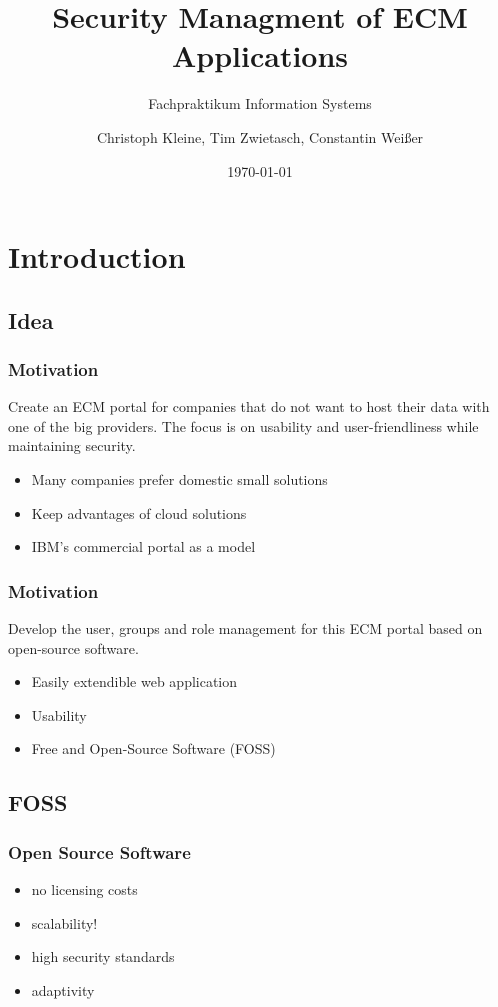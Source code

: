 \documentclass{beamer}
\title{Security Managment of ECM Applications}
\subtitle{Fachpraktikum Information Systems}
\author{Christoph Kleine, Tim Zwietasch, Constantin Weißer}
\date{\today}
\begin{document}
\frame{\titlepage}

\section{Introduction}
\subsection{Idea}
\begin{frame}
	\frametitle{Motivation}
	\begin{tcolorbox}[title=Overall Goal]
		Create an ECM portal for companies that do not want to host
		their data with one of the big providers. The focus is on
		usability and user-friendliness while maintaining security.
	\end{tcolorbox}

	\begin{itemize}
		\item Many companies prefer domestic small solutions
		\item Keep advantages of cloud solutions
		\item IBM's commercial portal as a model
	\end{itemize}
\end{frame}

\begin{frame}
	\frametitle{Motivation}
	\begin{tcolorbox}[title=Our Goal]
		Develop the user, groups and role management for this ECM portal
		based on open-source software.
	\end{tcolorbox}
	\begin{itemize}
		\item Easily extendible web application
		\item Usability
		\item Free and Open-Source Software (FOSS)
	\end{itemize}
\end{frame}

\subsection{FOSS}
\begin{frame}
	\frametitle{Open Source Software}
	\begin{tcolorbox}[title=Why use FOSS components?]
		\begin{itemize}
			\item no licensing costs
			\item scalability!
			\item high security standards
			\item adaptivity
		\end{itemize}
	\end{tcolorbox}
\end{frame}
\end{document}
